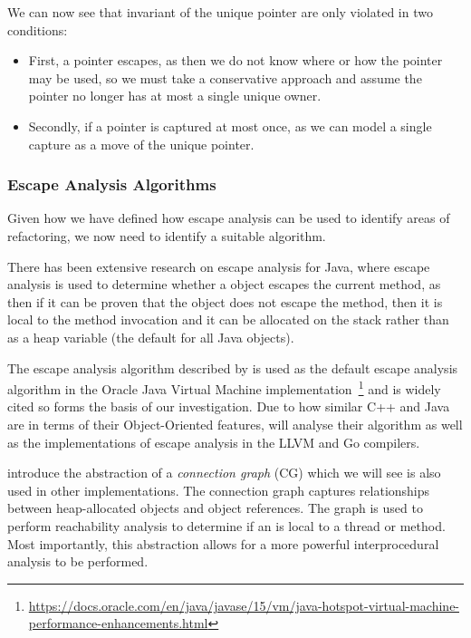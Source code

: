 \documentclass{proposal}
\begin{document}
    We can now see that invariant of the unique pointer are only violated in two conditions:
    \begin{itemize}
        \item First, a pointer escapes, as then we do not know where or how the pointer may be used, so we must take a conservative approach and assume the pointer no longer has at most a single unique owner.
        \item Secondly, if a pointer is captured at most once, as we can model a single capture as a move of the unique pointer.
    \end{itemize}

    \subsubsection{Escape Analysis Algorithms}\label{subsubsec:escape-analysis-algorithms}

    Given how we have defined how escape analysis can be used to identify areas of refactoring, we now need to identify a suitable algorithm.

    There has been extensive research on escape analysis for Java, where escape analysis is used to determine whether a object escapes the current method, as then if it can be proven that the object does not escape the method, then it is local to the method invocation and it can be allocated on the stack rather than as a heap variable (the default for all Java objects).

    The escape analysis algorithm described by \citet{Choi1999} is used as the default escape analysis algorithm in the Oracle Java Virtual Machine implementation~\footnote{\url{https://docs.oracle.com/en/java/javase/15/vm/java-hotspot-virtual-machine-performance-enhancements.html}} and is widely cited so forms the basis of our investigation.
    Due to how similar C++ and Java are in terms of their Object-Oriented features, will analyse their algorithm as well as the implementations of escape analysis in the LLVM and Go compilers.

    \citet{Choi1999} introduce the abstraction of a \emph{connection graph} (CG) which we will see is also used in other implementations.
    The connection graph captures relationships between heap-allocated objects and object references.
    The graph is used to perform reachability analysis to determine if an is local to a thread or method.
    Most importantly, this abstraction allows for a more powerful interprocedural analysis to be performed.
\end{document}
